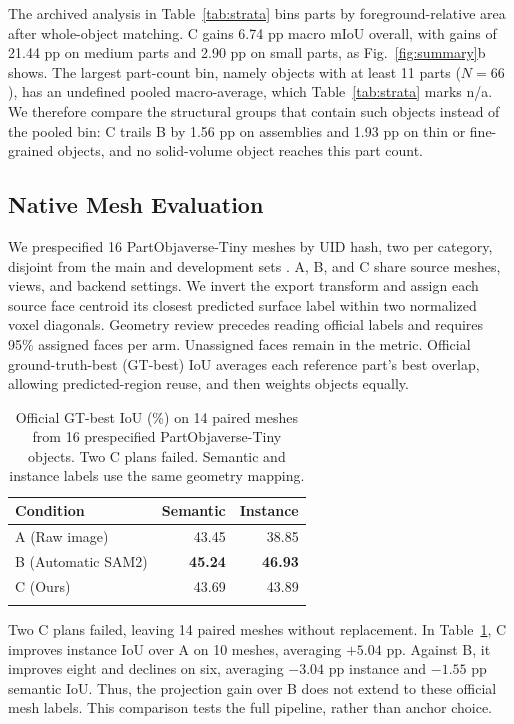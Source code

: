 \documentclass[pdflatex,sn-mathphys-ay]{sn-jnl}
\begin{document}
The archived analysis in Table~\ref{tab:strata} bins parts by foreground-relative area after whole-object matching. C gains 6.74 pp macro mIoU overall, with gains of 21.44 pp on medium parts and 2.90 pp on small parts, as Fig.~\ref{fig:summary}b shows.
The largest part-count bin, namely objects with at least 11 parts ($N=66$), has an undefined pooled macro-average, which Table~\ref{tab:strata} marks n/a. We therefore compare the structural groups that contain such objects instead of the pooled bin: C trails B by 1.56 pp on assemblies and 1.93 pp on thin or fine-grained objects, and no solid-volume object reaches this part count.

\subsection{Native Mesh Evaluation}\label{sec:native_mesh}
We prespecified 16 PartObjaverse-Tiny meshes by UID hash, two per category, disjoint from the main and development sets \citep{yang2024sampart3d}. A, B, and C share source meshes, views, and backend settings. We invert the export transform and assign each source face centroid its closest predicted surface label within two normalized voxel diagonals. Geometry review precedes reading official labels and requires 95\% assigned faces per arm. Unassigned faces remain in the metric. Official ground-truth-best (GT-best) IoU averages each reference part's best overlap, allowing predicted-region reuse, and then weights objects equally.

\begin{table}[t]
\caption{Official GT-best IoU (\%) on 14 paired meshes from 16 prespecified PartObjaverse-Tiny objects. Two C plans failed. Semantic and instance labels use the same geometry mapping.}
\label{tab:native_mesh}
\setlength{\tabcolsep}{8pt}
\begin{tabular}{@{}lrr@{}}
\toprule
Condition & Semantic & Instance\\
\midrule
A (Raw image) & 43.45 & 38.85\\
B (Automatic SAM2) & \textbf{45.24} & \textbf{46.93}\\
C (Ours) & 43.69 & 43.89\\
\botrule
\end{tabular}
\end{table}

Two C plans failed, leaving 14 paired meshes without replacement. In Table~\ref{tab:native_mesh}, C improves instance IoU over A on 10 meshes, averaging $+5.04$ pp. Against B, it improves eight and declines on six, averaging $-3.04$ pp instance and $-1.55$ pp semantic IoU. Thus, the projection gain over B does not extend to these official mesh labels. This comparison tests the full pipeline, rather than anchor choice.
\end{document}
